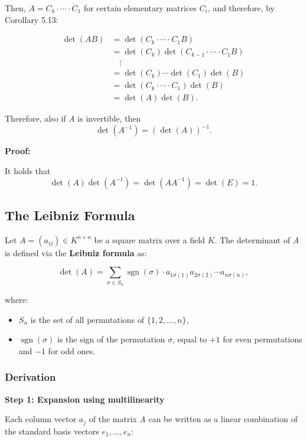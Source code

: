 Then, \( A = C_k \cdot \cdots \cdot C_1 \) for certain elementary matrices \( C_i \), and therefore, by Corollary 5.13:

\begin{align*}
\det(AB) &= \det(C_k \cdot \cdots \cdot C_1 B) \\
&= \det(C_k)\det(C_{k-1} \cdot \cdots \cdot C_1 B) \\
&\quad \vdots \\
&= \det(C_k) \cdots \det(C_1)\det(B) \\
&= \det(C_k \cdot \cdots \cdot C_1)\det(B) \\
&= \det(A)\det(B).
\end{align*}

Therefore, also if \emph{A} is invertible, then
\[
\det(A^{-1}) = {(\det(A))}^{-1}.
\]

\textbf{Proof:} 

It holds that
\[
\det(A)\det(A^{-1}) = \det(AA^{-1}) = \det(E) = 1.
\]

\subsection{The Leibniz Formula}

Let \( A = (a_{ij}) \in K^{n \times n} \) be a square matrix over a field \( K \). The determinant of \emph{A} is defined via the \textbf{Leibniz formula} as:

\[
\det(A) = \sum_{\sigma \in S_n} \operatorname{sgn}(\sigma) \cdot a_{1\sigma(1)} a_{2\sigma(2)} \cdots a_{n\sigma(n)},
\]

where:
\begin{itemize}
    \item \( S_n \) is the set of all permutations of \( \{1, 2, \dots, n\} \),
    \item \( \operatorname{sgn}(\sigma) \) is the sign of the permutation \( \sigma \), equal to \( +1 \) for even permutations and \( -1 \) for odd ones.
\end{itemize}

\subsubsection{Derivation}

\textbf{Step 1: Expansion using multilinearity}

Each column vector \( a_j \) of the matrix \emph{A} can be written as a linear combination of the standard basis vectors \( e_1, \dots, e_n \):

